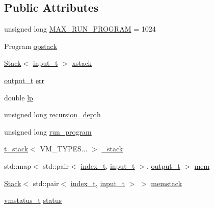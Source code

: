 \subsection*{Public Attributes}
\begin{DoxyCompactItemize}
\item 
unsigned long \hyperlink{class_virtual_machine_state_a8ad0bb79907ef1babd0a7b3a9cc88d46}{M\+A\+X\+\_\+\+R\+U\+N\+\_\+\+P\+R\+O\+G\+R\+AM} = 1024
\item 
Program \hyperlink{class_virtual_machine_state_af154a184be7061c9fc1ee7fa875cffa0}{opstack}
\item 
\hyperlink{class_stack}{Stack}$<$ \hyperlink{class_virtual_machine_state_a04c5592dddd5b9ffdae5a509d73127dd}{input\+\_\+t} $>$ \hyperlink{class_virtual_machine_state_a80b006dac38f49c469941d65bdc239fe}{xstack}
\item 
\hyperlink{class_virtual_machine_state_a005a025f97d9505b00e7f9f0e99002bb}{output\+\_\+t} \hyperlink{class_virtual_machine_state_aa3eaa4b1432d1604b86039d2ff0faae1}{err}
\item 
double \hyperlink{class_virtual_machine_state_a5937b2c3afdfe35b9bba71dbdd83d5bd}{lp}
\item 
unsigned long \hyperlink{class_virtual_machine_state_aa35593f67d1ea4e838fec8e7a8d33897}{recursion\+\_\+depth}
\item 
unsigned long \hyperlink{class_virtual_machine_state_afc2691c3bd3c7c3feba0708c2929ffe2}{run\+\_\+program}
\item 
\hyperlink{struct_virtual_machine_state_1_1t__stack}{t\+\_\+stack}$<$ V\+M\+\_\+\+T\+Y\+P\+E\+S... $>$ \hyperlink{class_virtual_machine_state_a55e2a8e32597a15740e9e38ae539200c}{\+\_\+stack}
\item 
std\+::map$<$ std\+::pair$<$ \hyperlink{class_virtual_machine_state_a95ba2f54f65b778c8a012ea3e7a0ee50}{index\+\_\+t}, \hyperlink{class_virtual_machine_state_a04c5592dddd5b9ffdae5a509d73127dd}{input\+\_\+t} $>$, \hyperlink{class_virtual_machine_state_a005a025f97d9505b00e7f9f0e99002bb}{output\+\_\+t} $>$ \hyperlink{class_virtual_machine_state_a8f36d4040b98a1e85fb7edf61e6085c9}{mem}
\item 
\hyperlink{class_stack}{Stack}$<$ std\+::pair$<$ \hyperlink{class_virtual_machine_state_a95ba2f54f65b778c8a012ea3e7a0ee50}{index\+\_\+t}, \hyperlink{class_virtual_machine_state_a04c5592dddd5b9ffdae5a509d73127dd}{input\+\_\+t} $>$ $>$ \hyperlink{class_virtual_machine_state_af7a7d7f942825d6f819a791dcb53617b}{memstack}
\item 
\hyperlink{_instruction_8h_a6202215407ab29590bb936ca2996cf64}{vmstatus\+\_\+t} \hyperlink{class_virtual_machine_state_a6e561a217081654b4187620953e86fff}{status}
\end{DoxyCompactItemize}
